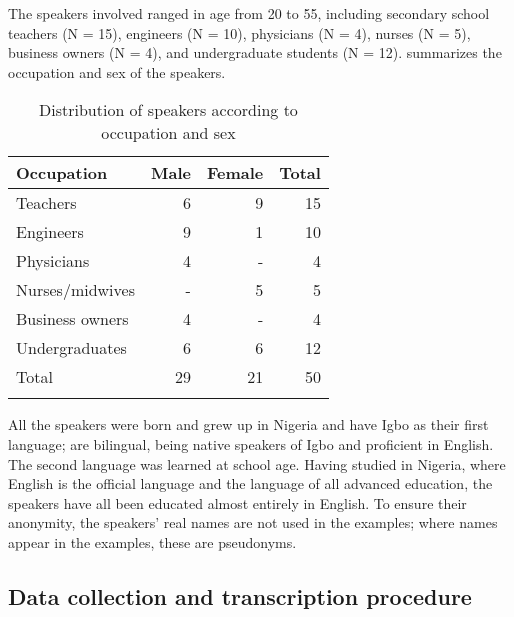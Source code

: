\documentclass[output=paper]{langsci/langscibook}
\begin{document}
The speakers involved ranged in age from 20 to 55, including secondary school teachers (N = 15), engineers (N = 10), physicians (N = 4), nurses (N = 5), business owners (N = 4), and undergraduate students (N = 12).  summarizes the occupation and sex of the speakers. 
 
\begin{table}
\caption{Distribution of speakers according to occupation and sex}
\label{tab:Ihemere:1}

\begin{tabularx}{.66\textwidth}{Xrrr}
\lsptoprule
Occupation & Male & Female & Total\\
\midrule
Teachers & 6 & 9 & 15\\
Engineers & 9 & 1 & 10\\
Physicians & 4 & - & 4\\
Nurses/midwives & - & 5 & 5\\
Business owners & 4 & - & 4\\
Undergraduates & 6 & 6 & 12\\
\midrule
Total & 29 & 21 & 50\\
\lspbottomrule
\end{tabularx}

\end{table} 

All the speakers were born and grew up in Nigeria and have Igbo as their first language; are bilingual, being native speakers of Igbo and proficient in English. The second language was learned at school age. Having studied in Nigeria, where English is the official language and the language of all advanced education, the speakers have all been educated almost entirely in English. To ensure their anonymity, the speakers’ real names are not used in the examples; where names appear in the examples, these are pseudonyms.

\subsection{Data collection and transcription procedure}
\end{document}
